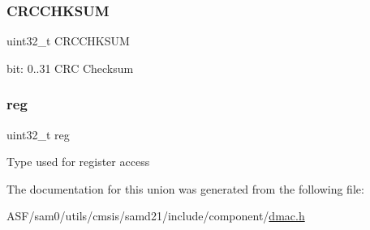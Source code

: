 \subsubsection{\texorpdfstring{CRCCHKSUM}{CRCCHKSUM}}
{\footnotesize\ttfamily uint32\+\_\+t C\+R\+C\+C\+H\+K\+S\+UM}

bit\+: 0..31 C\+RC Checksum \mbox{\label{union_d_m_a_c___c_r_c_c_h_k_s_u_m___type_a6b91636401516a477989a336376d7b40}} 
\subsubsection{\texorpdfstring{reg}{reg}}
{\footnotesize\ttfamily uint32\+\_\+t reg}

Type used for register access 

The documentation for this union was generated from the following file\+:\begin{DoxyCompactItemize}
\item 
A\+S\+F/sam0/utils/cmsis/samd21/include/component/\mbox{\hyperlink{component_2dmac_8h}{dmac.\+h}}\end{DoxyCompactItemize}
